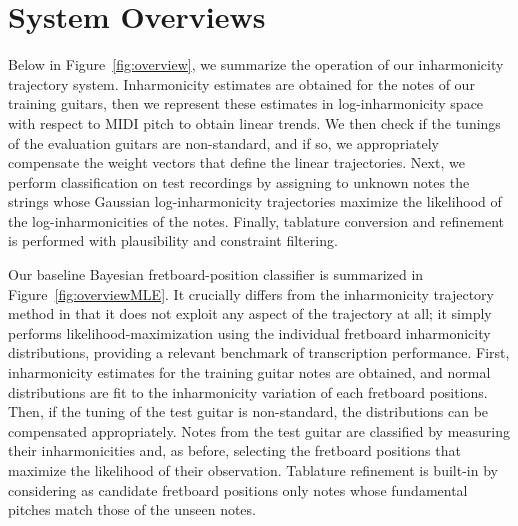 \documentclass[12pt]{cmuthesis}
\begin{document}
\section{System Overviews}
Below in Figure~\ref{fig:overview}, we summarize the operation of our inharmonicity trajectory system. Inharmonicity estimates are obtained for the notes of our training guitars, then we represent these estimates in log-inharmonicity space with respect to MIDI pitch to obtain linear trends. We then check if the tunings of the evaluation guitars are non-standard, and if so, we appropriately compensate the weight vectors that define the linear trajectories. Next, we perform classification on test recordings by assigning to unknown notes the strings whose Gaussian log-inharmonicity trajectories maximize the likelihood of the log-inharmonicities of the notes. Finally, tablature conversion and refinement is performed with plausibility and constraint filtering.

Our baseline Bayesian fretboard-position classifier is summarized in Figure~\ref{fig:overviewMLE}. It crucially differs from the inharmonicity trajectory method in that it does not exploit any aspect of the trajectory at all; it simply performs likelihood-maximization using the individual fretboard inharmonicity distributions, providing a relevant benchmark of transcription performance. First, inharmonicity estimates for the training guitar notes are obtained, and normal distributions are fit to the inharmonicity variation of each fretboard positions. Then, if the tuning of the test guitar is non-standard, the distributions can be compensated appropriately. Notes from the test guitar are classified by measuring their inharmonicities and, as before, selecting the fretboard positions that maximize the likelihood of their observation. Tablature refinement is built-in by considering as candidate fretboard positions only notes whose fundamental pitches match those of the unseen notes. 
\end{document}
